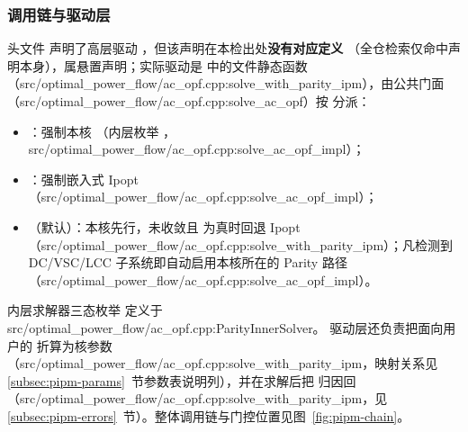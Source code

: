 \subsubsection*{调用链与驱动层}
头文件  声明了高层驱动
，但该声明在本检出处\textbf{没有对应定义}
（全仓检索仅命中声明本身），属悬置声明；实际驱动是
 中的文件静态函数 
（src/optimal\_power\_flow/ac\_opf.cpp:solve\_with\_parity\_ipm），由公共门面 
（src/optimal\_power\_flow/ac\_opf.cpp:solve\_ac\_opf）按  分派：
\begin{itemize}
  \item {}：强制本核
        （内层枚举 ，src/optimal\_power\_flow/ac\_opf.cpp:solve\_ac\_opf\_impl）；
  \item {}：强制嵌入式 Ipopt
        （src/optimal\_power\_flow/ac\_opf.cpp:solve\_ac\_opf\_impl）；
  \item {}（默认）：本核先行，未收敛且 
        为真时回退 Ipopt（src/optimal\_power\_flow/ac\_opf.cpp:solve\_with\_parity\_ipm）；凡检测到 DC/VSC/LCC
        子系统即自动启用本核所在的 Parity 路径（src/optimal\_power\_flow/ac\_opf.cpp:solve\_ac\_opf\_impl）。
\end{itemize}
内层求解器三态枚举  定义于 src/optimal\_power\_flow/ac\_opf.cpp:ParityInnerSolver。
驱动层还负责把面向用户的  折算为核参数
（src/optimal\_power\_flow/ac\_opf.cpp:solve\_with\_parity\_ipm，映射关系见
\ref{subsec:pipm-params}~节参数表说明列），并在求解后把 
归因回 （src/optimal\_power\_flow/ac\_opf.cpp:solve\_with\_parity\_ipm，见
\ref{subsec:pipm-errors}~节）。整体调用链与门控位置见图~\ref{fig:pipm-chain}。

